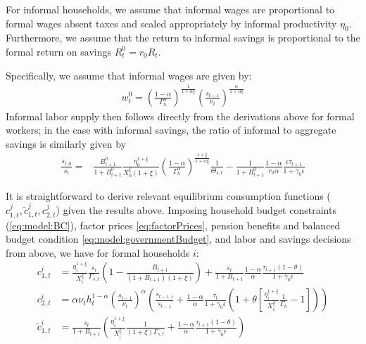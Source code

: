 \bigskip 
For informal households, we assume that informal wages are proportional to formal wages absent taxes and scaled appropriately by informal productivity $\eta_0$. Furthermore, we assume that the return to informal savings is proportional to the formal return on savings $R_t^0 = r_0 R_t$.


Specifically, we assume that informal wages are given by:
\begin{align*}
    w_t^0 = \left(\frac{1-\alpha}{\Gamma_{h}^{\alpha}}\right)^{\frac{1}{1+\alpha\xi}} \left(\frac{s_{t-1}}{\nu_t}\right)^{\frac{\alpha}{1+\alpha\xi}}
\end{align*}
Informal labor supply then follows directly from the derivations above for formal workers; in the case with informal savings, the ratio of informal to aggregate savings is similarly given by
\begin{align}\label{eq:s0_s}
    \frac{s_{t,0}}{s_t} =& \frac{B_{t+1}^0}{1+B_{t+1}^0}\frac{\eta_{0}^{1+\xi}}{X_{0}^{\xi}(1+\xi)}\left(\frac{1-\alpha}{\Gamma_{h}^{\alpha}}\right)^{\frac{1+\xi}{1+\alpha\xi}}
    \frac{1}{\Theta_{s,t}}-\frac{1}{1+B_{t+1}^0}\frac{1-\alpha}{r_0 \alpha}\frac{\epsilon\tau_{t+1}}{1+\gamma_0\epsilon }
\end{align}


It is straightforward to derive relevant equilibrium consumption functions ($c_{1,t}^j, \tilde{c}_{1,t}^j, c_{2,t}^j$) given the results above. Imposing household budget constraints (\ref{eq:model:BC}), factor prices \eqref{eq:factorPrices}, pension benefits and balanced budget condition \eqref{eq:model:governmentBudget}, and labor and savings decisions from above, we have for formal households $i$:
\begin{align}
    c_{1,t}^i &= \frac{\eta_{i}^{1+\xi}}{X_{i}^{\xi}}\frac{s_t}{\Gamma_{s,t}}\left(1-\frac{B_{t+1}}{(1+B_{t+1})(1+\xi)}\right)+\frac{s_t}{1+B_{t+1}}\frac{1-\alpha}{\alpha}\frac{ \tau_{t+1}(1-\theta)}{1+\gamma_0\epsilon} \\
    c_{2,t}^i &= \alpha \nu_t h_t^{1-\alpha}\left(\frac{s_{t-1}}{\nu_t}\right)^{\alpha}\left(\frac{s_{t-1,i}}{s_{t-1}}+\frac{1-\alpha}{\alpha}\frac{\tau_t}{1+\gamma_0\epsilon}\left(1+\theta\left[\frac{\eta_{i}^{1+\xi}}{X_{i}^{\xi}}\frac{1}{\Gamma_{h}}-1\right]\right)\right) \\
    \tilde{c}_{1,t}^i &= \frac{s_t}{1+B_{t+1}}\left(\frac{\eta_{i}^{1+\xi}}{X_{i}^{\xi}}\frac{1}{(1+\xi)\Gamma_{s,t}}+\frac{1-\alpha}{\alpha}\frac{\tau_{t+1}(1-\theta)}{1+\gamma_0\epsilon}\right)
\end{align}


